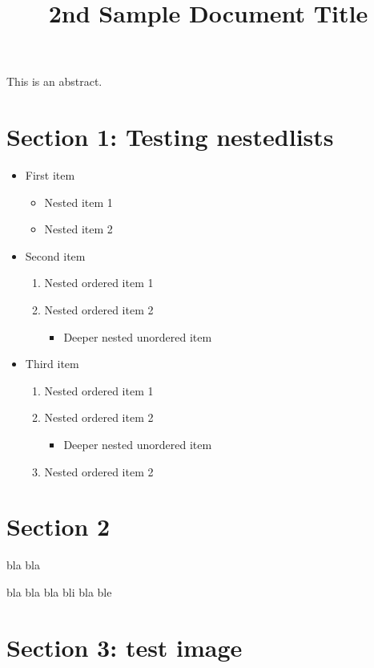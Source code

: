\documentclass[11pt,a4paper]{article}
\title{2nd Sample Document Title}
\begin{document}
\maketitle

This is an abstract.

\section{Section 1: Testing nestedlists}

\begin{itemize}
\item First item
  \begin{itemize}
\item Nested item 1
\item Nested item 2
  \end{itemize}
\item Second item
  \begin{enumerate}
\item Nested ordered item 1
\item Nested ordered item 2
    \begin{itemize}
\item Deeper nested unordered item
    \end{itemize}
  \end{enumerate}
\item Third item
  \begin{enumerate}
\item Nested ordered item 1
\item Nested ordered item 2
    \begin{itemize}
\item Deeper nested unordered item
    \end{itemize}
\item Nested ordered item 2
  \end{enumerate}
\end{itemize}

\section{Section 2}

bla bla

bla bla bla bli bla ble

\section{Section 3: test image}
\end{document}
